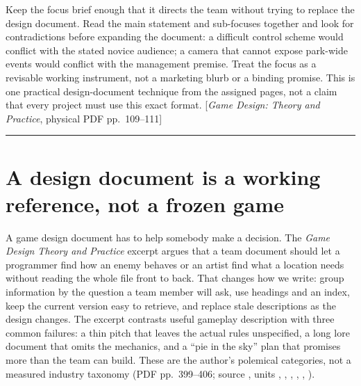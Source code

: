 Keep the focus brief enough that it directs the team without trying to replace the design document. Read the main statement and sub-focuses together and look for contradictions before expanding the document: a difficult control scheme would conflict with the stated novice audience; a camera that cannot expose park-wide events would conflict with the management premise. Treat the focus as a revisable working instrument, not a marketing blurb or a binding promise. This is one practical design-document technique from the assigned pages, not a claim that every project must use this exact format. {[}\emph{Game Design: Theory and Practice}, physical PDF pp.~109--111{]}

\begin{center}\rule{0.5\linewidth}{0.5pt}\end{center}

\section{A design document is a working reference, not a frozen game}\label{06-engine-ii-ch046-a-design-document-is-a-working-reference-not-a-frozen-game}

\hypertarget{06-engine-ii-ch046-a-design-document-is-a-working-reference-not-a-frozen-game}{}

A game design document has to help somebody make a decision. The \emph{Game Design Theory and Practice} excerpt argues that a team document should let a programmer find how an enemy behaves or an artist find what a location needs without reading the whole file front to back. That changes how we write: group information by the question a team member will ask, use headings and an index, keep the current version easy to retrieve, and replace stale descriptions as the design changes. The excerpt contrasts useful gameplay description with three common failures: a thin pitch that leaves the actual rules unspecified, a long lore document that omits the mechanics, and a ``pie in the sky'' plan that promises more than the team can build. These are the author's polemical categories, not a measured industry taxonomy (PDF pp.~399--406; source , units , , , , , ).

